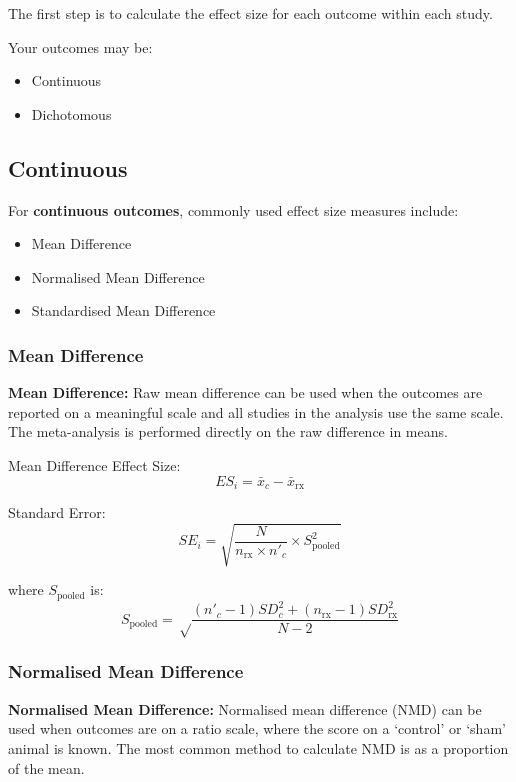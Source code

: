 \documentclass[
]{book}
\begin{document}
The first step is to calculate the effect size for each outcome within each study.

Your outcomes may be:

\begin{itemize}
\item
  Continuous
\item
  Dichotomous
\end{itemize}

\hypertarget{continuous}{%
\subsection{Continuous}\label{continuous}}

For \textbf{continuous outcomes}, commonly used effect size measures include:

\begin{itemize}
\item
  Mean Difference
\item
  Normalised Mean Difference
\item
  Standardised Mean Difference
\end{itemize}

\hypertarget{mean-difference}{%
\subsubsection{Mean Difference}\label{mean-difference}}

\textbf{Mean Difference:} Raw mean difference can be used when the outcomes are reported on a meaningful scale and all studies in the analysis use the same scale. The meta-analysis is performed directly on the raw difference in means.

Mean Difference Effect Size:
\[ ES_i = \bar{x}_c - \bar{x}_\text{rx}\]

Standard Error:
\[ SE_i = \sqrt{\frac {N}{n_{\text{rx}} \times n'_c} \times S_{\text{pooled}}^2} \]

where \(S_{\text{pooled}}\) is:
\[S_{\text{pooled}} = \sqrt \frac {(n'_c - 1)SD_c^2 + (n_{\text{rx}} - 1)SD_{\text{rx}}^2}{N -2} \]

\hypertarget{normalised-mean-difference}{%
\subsubsection{Normalised Mean Difference}\label{normalised-mean-difference}}

\textbf{Normalised Mean Difference:} Normalised mean difference (NMD) can be used when outcomes are on a ratio scale, where the score on a `control' or `sham' animal is known. The most common method to calculate NMD is as a proportion of the mean.
\end{document}

